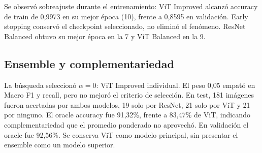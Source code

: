 \documentclass[10pt,a4paper]{article}
\begin{document}
Se observó sobreajuste durante el entrenamiento: ViT Improved alcanzó accuracy de train de 0,9973 en su mejor época (10), frente a 0,8595 en validación. Early stopping conservó el checkpoint seleccionado, no eliminó el fenómeno. ResNet Balanced obtuvo su mejor época en la 7 y ViT Balanced en la 9.
\subsection{Ensemble y complementariedad}
La búsqueda seleccionó $\alpha=0$: ViT Improved individual. El peso 0,05 empató en Macro F1 y recall, pero no mejoró el criterio de selección. En test, 181 imágenes fueron acertadas por ambos modelos, 19 solo por ResNet, 21 solo por ViT y 21 por ninguno. El oracle accuracy fue 91,32\%, frente a 83,47\% de ViT, indicando complementariedad que el promedio ponderado no aprovechó. En validación el oracle fue 92,56\%. Se conserva ViT como modelo principal, sin presentar el ensemble como un modelo superior.
\end{document}
